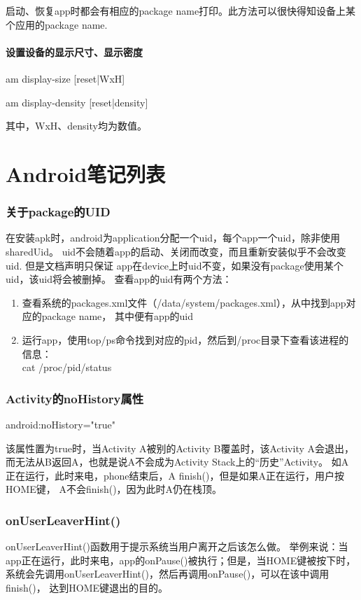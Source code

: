 ﻿\documentclass{article}
\begin{document}
  启动、恢复app时都会有相应的package name打印。此方法可以很快得知设备上某个应用的package name.
  
  \subsection[设置设备的显示尺寸、显示密度]{设置设备的显示尺寸、显示密度}
  am display-size [reset|WxH]
  
  am display-density [reset|density]
  
  其中，WxH、density均为数值。
  
  \part[Android Notes List]{Android笔记列表}
  \section[关于package的UID]{关于package的UID}
  在安装apk时，android为application分配一个uid，每个app一个uid，除非使用sharedUid。
	uid不会随着app的启动、关闭而改变，而且重新安装似乎不会改变uid. 但是文档声明只保证
	app在device上时uid不变，如果没有package使用某个uid，该uid将会被删掉。
	查看app的uid有两个方法：
  \begin{enumerate}
    \item 查看系统的packages.xml文件（/data/system/packages.xml），从中找到app对应的package name，
		      其中便有app的uid
    \item 运行app，使用top/ps命令找到对应的pid，然后到/proc目录下查看该进程的信息：\\
      		cat /proc/\lt pid\gt/status
  \end{enumerate}
  
  \section[Activity的noHistory属性]{Activity的noHistory属性}
  android:noHistory="true"
  
  该属性置为true时，当Activity A被别的Activity B覆盖时，该Activity A会退出，
  而无法从B返回A，也就是说A不会成为Activity Stack上的“历史”Activity。
  如A正在运行，此时来电，phone结束后，A finish()，但是如果A正在运行，用户按HOME键，
  A不会finish()，因为此时A仍在栈顶。
  
  \section[onUserLeaverHint()]{onUserLeaverHint()}
  onUserLeaverHint()函数用于提示系统当用户离开之后该怎么做。
  举例来说：当app正在运行，此时来电，app的onPause()被执行；但是，当HOME键被按下时，
  系统会先调用onUserLeaverHint()，然后再调用onPause()，可以在该中调用finish()，
  达到HOME键退出的目的。
  
\end{document}
